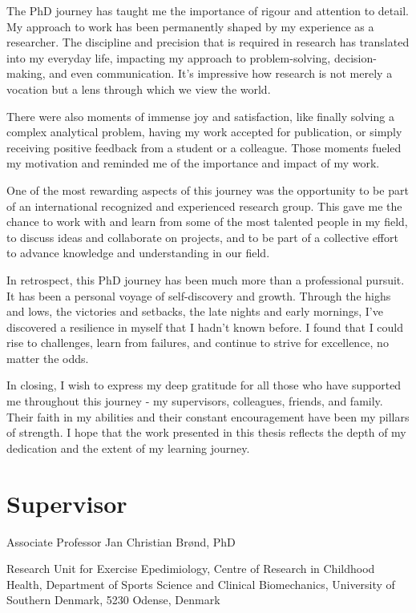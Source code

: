 \documentclass[
  8pt,
  letterpaper,
  DIV=11,
  numbers=noendperiod]{scrartcl}
\begin{document}
The PhD journey has taught me the importance of rigour and attention to
detail. My approach to work has been permanently shaped by my experience
as a researcher. The discipline and precision that is required in
research has translated into my everyday life, impacting my approach to
problem-solving, decision-making, and even communication. It's
impressive how research is not merely a vocation but a lens through
which we view the world.

There were also moments of immense joy and satisfaction, like finally
solving a complex analytical problem, having my work accepted for
publication, or simply receiving positive feedback from a student or a
colleague. Those moments fueled my motivation and reminded me of the
importance and impact of my work.

One of the most rewarding aspects of this journey was the opportunity to
be part of an international recognized and experienced research group.
This gave me the chance to work with and learn from some of the most
talented people in my field, to discuss ideas and collaborate on
projects, and to be part of a collective effort to advance knowledge and
understanding in our field.

In retrospect, this PhD journey has been much more than a professional
pursuit. It has been a personal voyage of self-discovery and growth.
Through the highs and lows, the victories and setbacks, the late nights
and early mornings, I've discovered a resilience in myself that I hadn't
known before. I found that I could rise to challenges, learn from
failures, and continue to strive for excellence, no matter the odds.

In closing, I wish to express my deep gratitude for all those who have
supported me throughout this journey - my supervisors, colleagues,
friends, and family. Their faith in my abilities and their constant
encouragement have been my pillars of strength. I hope that the work
presented in this thesis reflects the depth of my dedication and the
extent of my learning journey.

\newpage

\hypertarget{supervisor}{%
\section{Supervisor}\label{supervisor}}

Associate Professor Jan Christian Brønd, PhD

Research Unit for Exercise Epedimiology, Centre of Research in Childhood
Health, Department of Sports Science and Clinical Biomechanics,
University of Southern Denmark, 5230 Odense, Denmark
\end{document}

